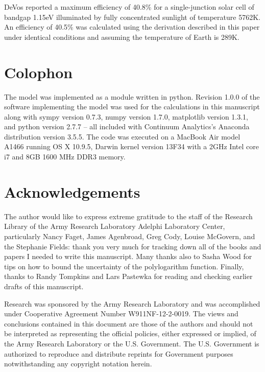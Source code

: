 \documentclass[letterpaper,12pt]{article}
\begin{document}
DeVos \cite{9780198513926} reported a maximum efficiency of 40.8\% for a single-junction solar cell of bandgap 1.15eV illuminated by fully concentrated sunlight of temperature 5762K. An efficiency of 40.5\% was calculated using the derivation described in this paper under identical conditions and assuming the temperature of Earth is 289K.


\section{Colophon}
The model was implemented as a module written in python. Revision 1.0.0 \cite{} of the software implementing the model was used for the calculations in this manuscript along with sympy version 0.7.3, numpy version 1.7.0, matplotlib version 1.3.1, and python version 2.7.7 -- all included with Continuum Analytics's Anaconda distribution version 3.5.5.  The code was executed on a MacBook Air model A1466 running OS X 10.9.5, Darwin kernel version 13F34 with a 2GHz Intel core i7 and 8GB 1600 MHz DDR3 memory.


\section{Acknowledgements}
The author would like to express extreme gratitude to the staff of the Research Library of the Army Research Laboratory Adelphi Laboratory Center, particularly Nancy Faget, James Agenbroad, Greg Cody, Louise McGovern, and the Stephanie Fields: thank you very much for tracking down all of the books and papers I needed to write this manuscript. Many thanks also to Sasha Wood for tips on how to bound the uncertainty of the polylogarithm function. Finally, thanks to Randy Tompkins and Lars Pastewka for reading and checking earlier drafts of this manuscript.

Research was sponsored by the Army Research Laboratory and was accomplished under Cooperative Agreement Number W911NF-12-2-0019. The views and conclusions contained in this document are those of the authors and should not be interpreted as representing the official policies, either expressed or implied, of the Army Research Laboratory or the U.S. Government. The U.S. Government is authorized to reproduce and distribute reprints for Government purposes notwithstanding any copyright notation herein.




\end{document}
